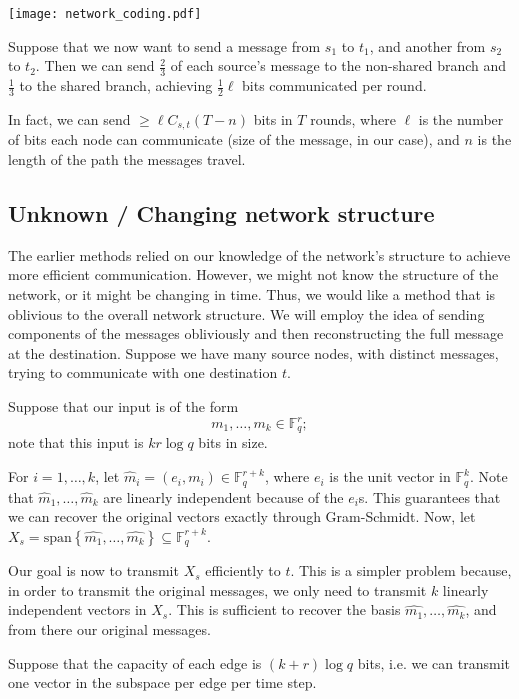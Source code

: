 \documentclass[11pt]{article}
\newcommand{\F}{\mathbb{F}}
\begin{document}
\begin{center}
\texttt{[image: network\_coding.pdf]}
\end{center}

Suppose that we now want to send a message from $s_1$ to $t_1$, and another from $s_2$ to $t_2$. Then we can send $\frac{2}{3}$ of each source's message to the non-shared branch and $\frac{1}{3}$ to the shared branch, achieving $\frac{1}{2}\ell$ bits communicated per round.

In fact, we can send $\geq \ell C_{s,t} (T - n)$ bits in $T$ rounds, where $\ell$ is the number of bits each node can communicate (size of the message, in our case), and $n$ is the length of the path the messages travel.

\subsection{Unknown / Changing network structure}

The earlier methods relied on our knowledge of the network's structure to achieve more efficient communication. However, we might not know the structure of the network, or it might be changing in time.  Thus, we would like a method that is oblivious to the overall network structure. We will employ the idea of sending components of the messages obliviously and then reconstructing the full message at the destination.  Suppose we have many source nodes, with distinct messages, trying to communicate with one destination $t$.

Suppose that our input is of the form
$$
m_1, \ldots, m_k \in \F_q^r;
$$
note that this input is $kr\log q$ bits in size.

For $i = 1,\dots,k$, let $\hat{m}_i = (e_i,m_i) \in \F_q^{r+k}$, where $e_i$ is the unit vector in $\F_q^k$. Note that $\hat{m}_1,\dots,\hat{m}_k$ are linearly independent because of the $e_i$s. This guarantees that we can recover the original vectors exactly through Gram-Schmidt. Now, let $X_s = \mathrm{span} \left\{ \hat{m_1}, \ldots, \hat{m_k} \right\} \subseteq \F_q^{r+k}$.

Our goal is now to transmit $X_s$ efficiently to $t$. This is a simpler problem because, in order to transmit the original messages, we only need to transmit $k$ linearly independent vectors in $X_s$. This is sufficient to recover the basis $\hat{m_1}, \ldots, \hat{m_k}$, and from there our original messages.

Suppose that the capacity of each edge is $(k+r) \log q$ bits, i.e. we can transmit one vector in the subspace per edge per time step.
\end{document}
